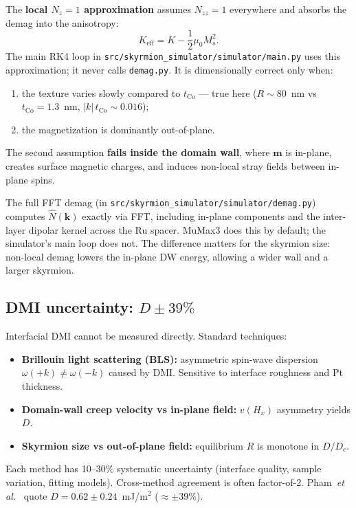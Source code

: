 \documentclass[11pt,a4paper]{article}
\newcommand{\mb}[1]{\mathbf{#1}}
\newcommand{\tCo}{t_{\text{Co}}}
\newcommand{\Keff}{K_{\text{eff}}}
\newcommand{\Ms}{M_s}
\begin{document}
The \textbf{local $N_z = 1$ approximation} assumes $N_{zz}=1$
everywhere and absorbs the demag into the anisotropy:
%
\begin{equation}
\Keff = K - \frac{1}{2}\mu_0 \Ms^2.
\end{equation}
%
The main RK4 loop in \texttt{src/skyrmion\_simulator/simulator/main.py} uses this
approximation; it never calls \texttt{demag.py}. It is dimensionally
correct only when:
\begin{enumerate}[leftmargin=2em, nosep]
    \item the texture varies slowly compared to $\tCo$ --- true here
        ($R \sim 80$~nm vs $\tCo = 1.3$~nm, $|k|\,\tCo \sim 0.016$);
    \item the magnetization is dominantly out-of-plane.
\end{enumerate}
The second assumption \textbf{fails inside the domain wall}, where
$\mb{m}$ is in-plane, creates surface magnetic charges, and induces
non-local stray fields between in-plane spins.

The full FFT demag (in \texttt{src/skyrmion\_simulator/simulator/demag.py}) computes
$\hat N(\mb{k})$ exactly via FFT, including in-plane components and
the inter-layer dipolar kernel across the Ru spacer. MuMax3 does
this by default; the simulator's main loop does not.  The
difference matters for the skyrmion size: non-local demag lowers
the in-plane DW energy, allowing a wider wall and a larger
skyrmion.

\subsection{DMI uncertainty: $D \pm 39\%$}

Interfacial DMI cannot be measured directly. Standard techniques:
\begin{itemize}[leftmargin=2em, nosep]
    \item \textbf{Brillouin light scattering (BLS):} asymmetric
        spin-wave dispersion $\omega(+k)\neq\omega(-k)$ caused by DMI.
        Sensitive to interface roughness and Pt thickness.
    \item \textbf{Domain-wall creep velocity vs in-plane field:}
        $v(H_x)$ asymmetry yields $D$.
    \item \textbf{Skyrmion size vs out-of-plane field:} equilibrium
        $R$ is monotone in $D/D_c$.
\end{itemize}
Each method has 10--30\% systematic uncertainty (interface quality,
sample variation, fitting models). Cross-method agreement is often
factor-of-2. Pham~\emph{et al.}~\cite{pham2024} quote
$D = 0.62 \pm 0.24$~mJ/m$^2$ ($\approx \pm 39\%$).
\end{document}
